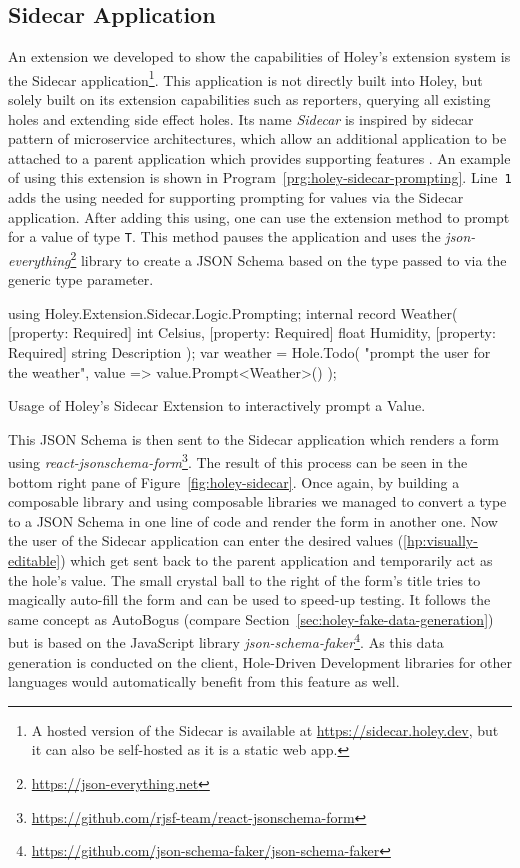 \subsection{Sidecar Application}
\label{sec:holey-sidecar}
An extension we developed to show the capabilities of Holey's extension system is the Sidecar application\footnote{A hosted version of the Sidecar is available at \url{https://sidecar.holey.dev}, but it can also be self-hosted as it is a static web app.}.
This application is not directly built into Holey, but solely built on its extension capabilities such as reporters, querying all existing holes and extending side effect holes.
Its name \emph{Sidecar} is inspired by sidecar pattern of microservice architectures, which allow an additional application to be attached to a parent application which provides supporting features \cite{microsoft_sidecar_nodate}.
An example of using this extension is shown in Program~\ref{prg:holey-sidecar-prompting}.
Line~\verb|1| adds the using needed for supporting prompting for values via the Sidecar application.
After adding this using, one can use the extension method \texttt{} to prompt for a value of type \verb|T|.
This method pauses the application and uses the \emph{json-everything}\footnote{\url{https://json-everything.net}} library to create a JSON Schema based on the type passed to \texttt{} via the generic type parameter.
%
\begin{program}[ht]
\begin{CsCode}
using Holey.Extension.Sidecar.Logic.Prompting;
internal record Weather(
	[property: Required] int Celsius,
	[property: Required] float Humidity,
	[property: Required] string Description
);
var weather = Hole.Todo(
	"prompt the user for the weather",
	value => value.Prompt<Weather>()
);
\end{CsCode}
\caption{Usage of Holey's Sidecar Extension to interactively prompt a Value.}
\label{prg:holey-sidecar-prompting}
\end{program}
%
This JSON Schema is then sent to the Sidecar application which renders a form using \emph{react-jsonschema-form}\footnote{\url{https://github.com/rjsf-team/react-jsonschema-form}}.
The result of this process can be seen in the bottom right pane of Figure~\ref{fig:holey-sidecar}.
Once again, by building a composable library and using composable libraries we managed to convert a type to a JSON Schema in one line of code and render the form in another one.
Now the user of the Sidecar application can enter the desired values (\ref{hp:visually-editable}) which get sent back to the parent application and temporarily act as the hole's value.
The small crystal ball to the right of the form's title tries to magically auto-fill the form and can be used to speed-up testing.
It follows the same concept as AutoBogus (compare Section~\ref{sec:holey-fake-data-generation}) but is based on the JavaScript library \emph{json-schema-faker}\footnote{\url{https://github.com/json-schema-faker/json-schema-faker}}.
As this data generation is conducted on the client, Hole-Driven Development libraries for other languages would automatically benefit from this feature as well.

